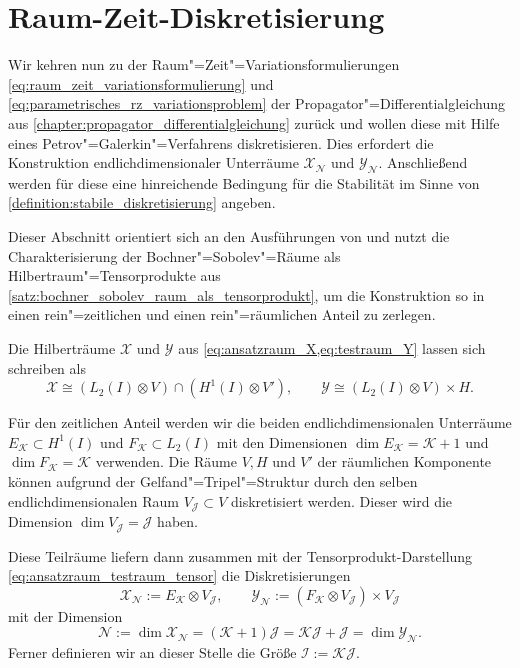 \documentclass[../main.tex]{subfiles}
\begin{document}
\section{Raum-Zeit-Diskretisierung} %
\label{section:raum_zeit_diskretisierung}

Wir kehren nun zu der Raum"=Zeit"=Variationsformulierungen \cref{eq:raum_zeit_variationsformulierung} und \cref{eq:parametrisches_rz_variationsproblem} der Propagator"=Differentialgleichung aus \cref{chapter:propagator_differentialgleichung} zurück und wollen diese mit Hilfe eines Petrov"=Galerkin"=Verfahrens diskretisieren.
Dies erfordert die Konstruktion endlichdimensionaler Unterräume $\mathcal X_{\mathcal N}$ und $\mathcal Y_{\mathcal N}$.
Anschließend werden für diese eine hinreichende Bedingung für die Stabilität im Sinne von \cref{definition:stabile_diskretisierung} angeben.

Dieser Abschnitt orientiert sich an den Ausführungen von \textcite{Andreev:2012uh,Andreev:2012ep} und nutzt die Charakterisierung der Bochner"=Sobolev"=Räume als Hilbertraum"=Tensorprodukte aus \cref{satz:bochner_sobolev_raum_als_tensorprodukt}, um die Konstruktion so in einen rein"=zeitlichen und einen rein"=räumlichen Anteil zu zerlegen.

\begin{Korollar}\label{korollar:ansatz_und_testraum_als_tensorprodukt}
    Die Hilberträume $\mathcal X$ und $\mathcal Y$ aus \cref{eq:ansatzraum_X,eq:testraum_Y} lassen sich schreiben als
    \begin{equation}\label{eq:ansatzraum_testraum_tensor}
        \mathcal X \cong (L_2(I) \otimes V) \cap (H^{1}(I) \otimes V'),
        \qquad
        \mathcal Y \cong (L_{2}(I) \otimes V) \times H.
    \end{equation}
\end{Korollar}

Für den zeitlichen Anteil werden wir die beiden endlichdimensionalen Unterräume $E_{\mathcal K} \subset H^{1}(I)$ und $F_{\mathcal K} \subset L_{2}(I)$ mit den Dimensionen $\dim E_{\mathcal K} = \mathcal K + 1$ und $\dim F_{\mathcal K} = \mathcal K$ verwenden.
Die Räume $V, H$ und $V'$ der räumlichen Komponente können aufgrund der Gelfand"=Tripel"=Struktur
durch den selben endlichdimensionalen Raum $V_{\mathcal J} \subset V$ diskretisiert werden.
Dieser wird die Dimension $\dim V_{\mathcal J} = \mathcal J$ haben.

Diese Teilräume liefern dann zusammen mit der Tensorprodukt-Darstellung \cref{eq:ansatzraum_testraum_tensor} die Diskretisierungen
\begin{equation}
\label{eq:diskrete_tensor_raueme}
    \mathcal X_{\mathcal N} := E_{\mathcal K} \otimes V_{\mathcal J}, \qquad \mathcal Y_{\mathcal N} := (F_{\mathcal K} \otimes V_{\mathcal J}) \times V_{\mathcal J}
\end{equation}
mit der Dimension
\begin{equation}
    \mathcal N := \dim \mathcal X_{\mathcal N} = (\mathcal K + 1) \mathcal J = \mathcal K \mathcal J + \mathcal J = \dim \mathcal Y_{\mathcal N}.
\end{equation}
Ferner definieren wir an dieser Stelle die Größe $\mathcal I := \mathcal K \mathcal J$.
\end{document}
